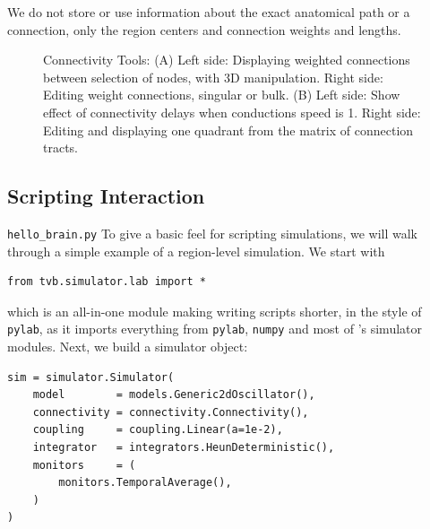 We do not store or use information about the exact anatomical path or a connection, only the region centers and connection weights and lengths.

 \begin{figure}
 	\centering
	\qquad
	\caption{Connectivity Tools: 
	(A) Left side: Displaying weighted connections between selection of nodes, with 3D manipulation.
	Right side: Editing weight connections, singular or bulk.
	(B) Left side: Show effect of connectivity delays when conductions speed is 1.
	Right side: Editing and displaying one quadrant from the matrix of connection tracts.}
        \label{fig:connectivity}
\end{figure}



\subsection{Scripting Interaction}

\texttt{hello\_brain.py}
To give a basic feel for scripting \TVB simulations, we will 
walk through a simple example of a region-level simulation. We 
start with

\begin{lstlisting}
from tvb.simulator.lab import *
\end{lstlisting}

\noindent which is an all-in-one module making writing scripts
shorter, in the style of \texttt{pylab}, as it imports everything
from \texttt{pylab}, \texttt{numpy} and most of \TVB's simulator
modules. Next, we build a simulator object:

\begin{lstlisting}
sim = simulator.Simulator(
    model        = models.Generic2dOscillator(), 
    connectivity = connectivity.Connectivity(),
    coupling     = coupling.Linear(a=1e-2),
    integrator   = integrators.HeunDeterministic(),
    monitors     = (
        monitors.TemporalAverage(), 
    )
)
\end{lstlisting}

